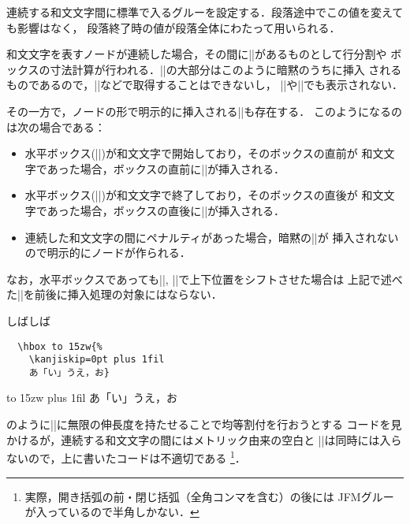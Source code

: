 \documentclass[a4paper,11pt,nomag]{jsarticle}
\begin{document}
\begin{cslist}
\csitem[\.{kanjiskip}=<skip>]
  連続する和文文字間に標準で入るグルーを設定する．段落途中でこの値を変えても影響はなく，
  段落終了時の値が段落全体にわたって用いられる．
\end{cslist}

\begin{dangerous}
 和文文字を表すノードが連続した場合，その間に|\kanjiskip|があるものとして行分割や
 ボックスの寸法計算が行われる．|\kanjiskip|の大部分はこのように暗黙のうちに挿入
 されるものであるので，|\lastskip|などで取得することはできないし，
 |\showlists|や|\showbox|でも表示されない．

  その一方で，ノードの形で明示的に挿入される|\kanjiskip|も存在する．
  このようになるのは次の場合である：
 \begin{itemize}
  \item 水平ボックス(|\hbox|)が和文文字で開始しており，そのボックスの直前が
    和文文字であった場合，ボックスの直前に|\kanjiskip|が挿入される．
  \item 水平ボックス(|\hbox|)が和文文字で終了しており，そのボックスの直後が
    和文文字であった場合，ボックスの直後に|\kanjiskip|が挿入される．
  \item 連続した和文文字の間にペナルティがあった場合，暗黙の|\kanjiskip|が
    挿入されないので明示的にノードが作られる．
 \end{itemize}
 なお，水平ボックスであっても|\raise|, |\lower|で上下位置をシフトさせた場合は
 上記で述べた|\kanjiskip|を前後に挿入処理の対象にはならない．
\end{dangerous}
\begin{dangerous}
  しばしば

  \medskip
  \begin{minipage}{.6\linewidth}
  \begin{verbatim}
  \hbox to 15zw{%
    \kanjiskip=0pt plus 1fil
    あ「い」うえ，お}
  \end{verbatim}
  \end{minipage}\hfill
  \begin{minipage}{.3\linewidth}
  \hbox to 15zw{%
    \kanjiskip=0pt plus 1fil
    あ「い」うえ，お}
  \end{minipage}

  \noindent
  のように|\kanjiskip|に無限の伸長度を持たせることで均等割付を行おうとする
  コードを見かけるが，連続する和文文字の間にはメトリック由来の空白と
  |\kanjiskip|は同時には入らないので，上に書いたコードは不適切である
 \footnote{実際，開き括弧の前・閉じ括弧（全角コンマを含む）の後には
 JFMグルーが入っているので半角しかない．
 }．
\end{dangerous}
\end{document}
